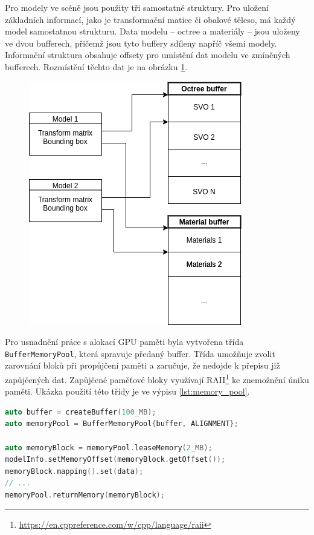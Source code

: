 Pro modely ve scéně jsou použity tři samostatné struktury. Pro uložení základních informací, jako je transformační matice či obalové těleso, má každý model samostatnou strukturu. Data modelu -- octree a materiály -- jsou uloženy ve dvou bufferech, přičemž jsou tyto buffery sdíleny napříč všemi modely. Informační struktura obsahuje offsety pro umístění dat modelu ve zmíněných bufferech. Rozmístění těchto dat je na obrázku \ref{fig:model_storage}.

\begin{figure}[H]
	\centering
	\includegraphics[scale=0.7]{images/model_storage.png}
	\captionsetup{justification=centering}
	\label{fig:model_storage}
\end{figure}

Pro usnadnění práce s alokací GPU paměti byla vytvořena třída \texttt{BufferMemoryPool}, která spravuje předaný buffer. Třída umožňuje zvolit zarovnání bloků při propůjčení paměti a zaručuje, že nedojde k přepisu již zapůjčených dat. Zapůjčené paměťové bloky využívají RAII\footnote{\url{https://en.cppreference.com/w/cpp/language/raii}} ke znemožnění úniku paměti.  Ukázka použití této třídy je ve výpisu \ref{lst:memory_pool}.

\begin{lstlisting}[label={lst:memory_pool}, language=C++, caption={Ukázka využití memory pool}]
auto buffer = createBuffer(100_MB);
auto memoryPool = BufferMemoryPool{buffer, ALIGNMENT};

auto memoryBlock = memoryPool.leaseMemory(2_MB);
modelInfo.setMemoryOffset(memoryBlock.getOffset());
memoryBlock.mapping().set(data);
// ...
memoryPool.returnMemory(memoryBlock);
\end{lstlisting}

